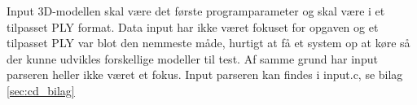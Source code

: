 Input 3D-modellen skal være det første programparameter og skal være i et tilpasset PLY format. Data input har ikke været fokuset for opgaven og et tilpasset PLY var blot den nemmeste måde, hurtigt at få et system op at køre så der kunne udvikles forskellige modeller til test. Af samme grund har input parseren heller ikke været et fokus. Input parseren kan findes i input.c, se bilag \ref{sec:cd_bilag}